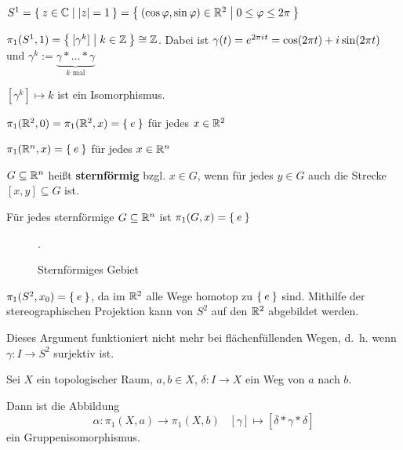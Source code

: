 \begin{beispiel}
    \begin{bspenum}
        \item $S^1 = \Set{z \in \ensuremath{\mathbb{C}}| {|z|} = 1} = \Set{(\cos \varphi, \sin \varphi) \in \ensuremath{\mathbb{R}}^2 | 0 \leq \varphi \leq 2 \pi}$

              $\pi_1 (S^1, 1) = \Set{[\gamma^k] | k \in \ensuremath{\mathbb{Z}}} \cong \mathbb{Z}$.
              Dabei ist $\gamma(t) = e^{2 \pi {i\mkern1mu} t} = \cos(2 \pi t) + {i\mkern1mu} \sin(2 \pi t)$
              und $\gamma^k := \underbrace{\gamma * \dots * \gamma}_{k \text{ mal}}$

              $[\gamma^k] \mapsto k$ ist ein Isomorphismus.
        \item $\pi_1 (\mathbb{R}^2, 0) = \pi_1 (\mathbb{R}^2, x) = \Set{e}$ für jedes $x \in \mathbb{R}^2$
        \item $\pi_1 (\mathbb{R}^n, x) = \Set{e}$ für jedes $x \in \mathbb{R}^n$
        \item $G \subseteq \mathbb{R}^n$ heißt \textbf{sternförmig} bzgl. $x \in G$, 
            wenn für jedes $y \in G$ auch die Strecke $[x, y] \subseteq G$
            ist.

            Für jedes sternförmige $G \subseteq \mathbb{R}^n$ ist
            $\pi_1(G,x) = \Set{e}$

            \begin{figure}[htp]
                \centering
                
                \caption{Sternförmiges Gebiet}.
                \label{fig:sternfoermiges-gebiet}
            \end{figure}
        \item $\pi_1(S^2, x_0) = \Set{e}$, da im $\mathbb{R}^2$ alle Wege
              homotop zu $\Set{e}$ sind. Mithilfe der stereographischen
              Projektion kann von $S^2$ auf den $\mathbb{R}^2$ abgebildet
              werden.

              Dieses Argument funktioniert nicht mehr bei flächenfüllenden
              Wegen, d.~h. wenn $\gamma: I \rightarrow S^2$ surjektiv
              ist.
    \end{bspenum}
\end{beispiel}

\begin{bemerkung}\label{kor:gruppenisomorphismus-wege}
    Sei $X$ ein topologischer Raum, $a,b \in X$, $\delta: I \rightarrow X$
    ein Weg von $a$ nach $b$.

    Dann ist die Abbildung
    \[\alpha: \pi_1 (X, a) \rightarrow \pi_1(X,b)\;\;\;[\gamma] \mapsto [\overline{\delta} * \gamma * \delta]\]
    ein Gruppenisomorphismus.
\end{bemerkung}

